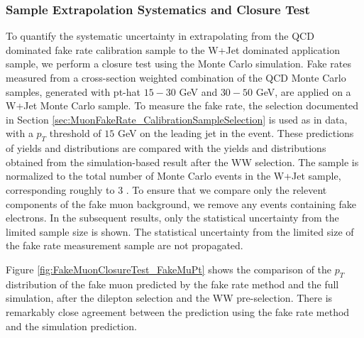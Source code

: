  \subsubsection{Sample Extrapolation Systematics and Closure Test}
\label{sec:FakeMuonBkgClosureTest}
 To quantify the systematic uncertainty in extrapolating from the QCD dominated fake rate
calibration sample to the W+Jet dominated application sample, we perform a closure test using 
the Monte Carlo simulation. Fake rates measured from a cross-section weighted combination of 
the QCD Monte Carlo samples, generated with pt-hat $15-30$ GeV and $30-50$ GeV, are applied on
a W+Jet Monte Carlo sample. To measure the fake rate, the selection documented in Section
\ref{sec:MuonFakeRate_CalibrationSampleSelection} is used as in data, with a $p_{T}$ 
threshold of $15$ GeV on the leading jet in the event. These predictions of yields and 
distributions are compared with the yields and distributions obtained from the 
simulation-based result after the WW selection. The sample is normalized to the 
total number of Monte Carlo events in the W+Jet sample, corresponding roughly to $3$ \ifb.
To ensure that we compare only the relevent components of the fake muon background,
we remove any events containing fake electrons. In the subsequent results, 
only the statistical uncertainty from the limited sample size is shown. 
The statistical uncertainty from the limited size of 
the fake rate measurement sample are not propagated. 

Figure \ref{fig:FakeMuonClosureTest_FakeMuPt} shows the comparison of the $p_{T}$
distribution of the fake muon predicted by the fake rate method and the full simulation,
after the dilepton selection and the WW pre-selection. There is remarkably close 
agreement between the prediction using the fake rate method and the simulation
prediction.

